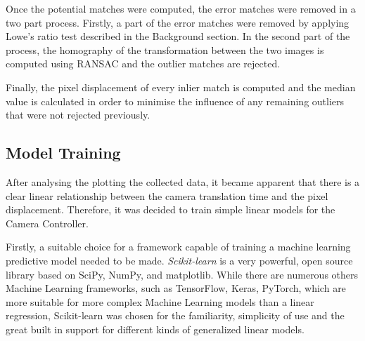 \documentclass{l4proj}
\begin{document}
Once the potential matches were computed, the error matches were removed in a two part process. Firstly, a part of the error matches were removed by applying Lowe's ratio test described in the Background section. In the second part of the process, the homography of the transformation between the two images is computed using RANSAC and the outlier matches are rejected. 

Finally, the pixel displacement of every inlier match is computed and the median value is calculated in order to minimise the influence of any remaining outliers that were not rejected previously.  


\subsection{Model Training}

After analysing the plotting the collected data, it became apparent that there is a clear linear relationship between the camera translation time and the pixel displacement. Therefore, it was decided to train simple linear models for the Camera Controller. 

Firstly, a suitable choice for a framework capable of training a machine learning predictive model needed to be made. \textit{Scikit-learn} is a very powerful, open source library based on SciPy, NumPy, and matplotlib. While there are numerous others Machine Learning frameworks, such as TensorFlow, Keras, PyTorch, which are more suitable for more complex Machine Learning models than a linear regression, Scikit-learn was chosen for the familiarity, simplicity of use and the great built in support for different kinds of generalized linear models.
\end{document}
